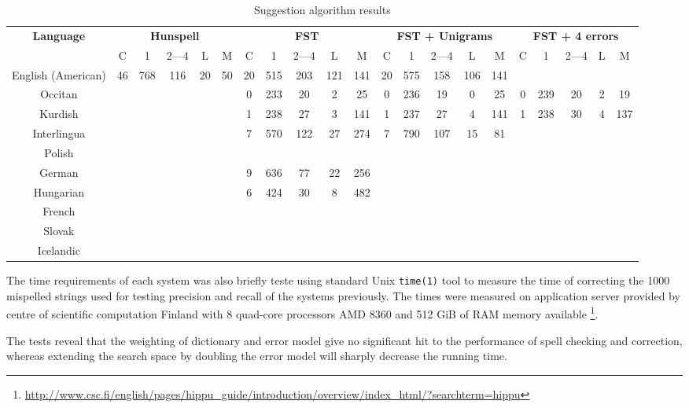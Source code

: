 \documentclass[a4paper,runningheads]{llncs}
\begin{document}
\begin{table}[tbp]
  \caption{Suggestion algorithm results}
  \label{table:error-analysis}
  \centering
  \begin{scriptsize}
  \begin{tabular}{c ccccc ccccc ccccc ccccc}
    \hline
    \textbf{Language} & \multicolumn{5}{c}{\bf Hunspell} & \multicolumn{5}{c}{\bf FST} & \multicolumn{5}{c}{\bf FST + Unigrams} & \multicolumn{5}{c}{\bf FST + 4 errors}  \\
    & C & 1 & 2---4 & L & M & C & 1 & 2---4 & L & M & C & 1 & 2---4 & L & M & C & 1 & 2---4 & L & M  \\
    \hline
    \hline
    English (American) & 46 & 768 & 116 & 20 & 50 & 20 & 515 & 203 & 121 & 141 & 20 & 575 & 158 & 106 & 141 &&&& \\
    Occitan & &&&& & 0 & 233 & 20 & 2 & 25 & 0 & 236 & 19 & 0 & 25 & 0 & 239 & 20 & 2 & 19 \\
    Kurdish & &&&& & 1 & 238 & 27 & 3 & 141 & 1 & 237 & 27 & 4 & 141 & 1 & 238 & 30 & 4 & 137 \\
    Interlingua & &&&& & 7 & 570 & 122 & 27 & 274 & 7 & 790 & 107 & 15 & 81 & \\
    Polish & &&&& &&&& &&&& \\
    German & &&&& & 9 & 636 & 77 & 22 & 256 &&& &&&& \\
    Hungarian & &&&& & 6 & 424 & 30 & 8 & 482 &&& &&&& \\
    French & \\
    Slovak & \\
    Icelandic & \\
    \hline
  \end{tabular}
  \end{scriptsize}
\end{table}

The time requirements of each system was also briefly teste using standard
Unix \verb|time(1)| tool to measure the time of correcting the 1000
mispelled strings used for testing precision and recall of the systems
previously. The times were measured on application server provided by
centre of scientific computation Finland with 8 quad-core processors 
AMD 8360 and 512 GiB of RAM memory available 
\footnote{\url{http://www.csc.fi/english/pages/hippu\_guide/introduction/overview/index\_html/?searchterm=hippu}}.

The tests reveal that the weighting of dictionary and error model give no
significant hit to the performance of spell checking and correction, whereas
extending the search space by doubling the error model will sharply decrease the
running time.
\end{document}
